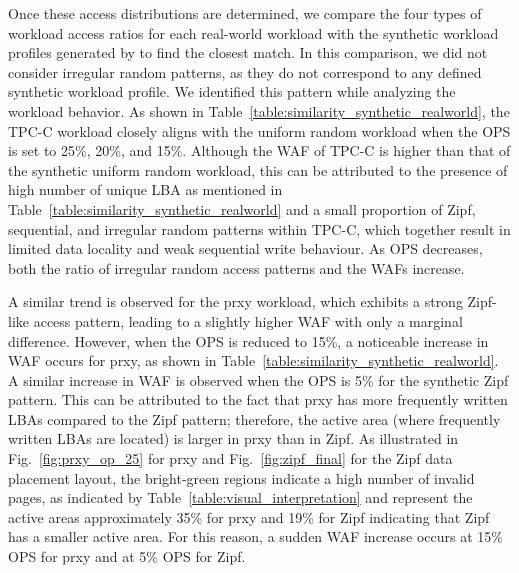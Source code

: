 \documentclass{ieeeaccess}
\begin{document}
Once these access distributions are determined, we compare the four types of workload access ratios for each real-world workload with the synthetic workload profiles generated by \eyanassdsim to find the closest match. 
In this comparison, we did not consider irregular random patterns, as they do not correspond to any defined synthetic workload profile. We identified this pattern while analyzing the workload behavior. As shown in Table~\ref{table:similarity_synthetic_realworld}, the TPC-C workload closely aligns with the uniform random workload when the OPS is set to 25\%, 20\%, and 15\%. Although the WAF of TPC-C is higher than that of the synthetic uniform random workload, this can be attributed to the presence of high number of unique LBA as mentioned in Table~\ref{table:similarity_synthetic_realworld} and a small proportion of Zipf, sequential, and irregular random patterns within TPC-C, which together result in limited data locality and weak sequential write behaviour. As OPS decreases, both the ratio of irregular random access patterns and the WAFs increase. 

A similar trend is observed for the prxy workload, which exhibits a strong Zipf-like access pattern, leading to a slightly higher WAF with only a marginal difference.
However, when the OPS is reduced to 15\%, a noticeable increase in WAF occurs for prxy, as shown in Table~\ref{table:similarity_synthetic_realworld}.
A similar increase in WAF is observed when the OPS is 5\% for the synthetic Zipf pattern. This can be attributed to the fact that prxy has more frequently written LBAs compared to the Zipf pattern; therefore, the active area (where frequently written LBAs are located) is larger in prxy than in Zipf. As illustrated in Fig.~\ref{fig:prxy_op_25} for prxy and Fig.~\ref{fig:zipf_final} for the Zipf data placement layout, the bright-green regions indicate a high number of invalid pages, as indicated by Table~\ref{table:visual_interpretation} and represent the active areas approximately 35\% for prxy and 19\% for Zipf indicating that Zipf has a smaller active area.
For this reason, a sudden WAF increase occurs at 15\% OPS for prxy and at 5\% OPS for Zipf.
\end{document}
